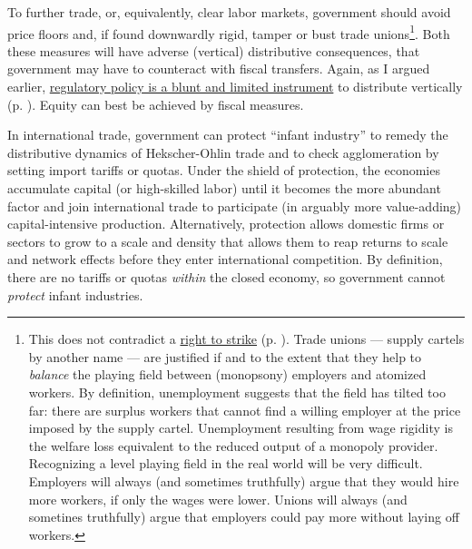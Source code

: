 To further trade, or, equivalently, clear labor markets, government should avoid price floors and, if found downwardly rigid, tamper or bust trade unions\footnote{
	This does not contradict a \hyperref[sec:redistributive_policy]{right to strike} (p. \pageref{sec:redistributive_policy}). Trade unions --- supply cartels by another name --- are justified if and to the extent that they help to \emph{balance} the playing field between (monopsony) employers and atomized workers. By definition, unemployment suggests that the field has tilted too far: there are surplus workers that cannot find a willing employer at the price imposed by the supply cartel. Unemployment resulting from wage rigidity is the welfare loss equivalent to the reduced output of a monopoly provider.\\
	Recognizing a level playing field in the real world will be very difficult. Employers will always (and sometimes truthfully) argue that they would hire more workers, if only the wages were lower. Unions will always (and sometines truthfully) argue that employers could pay more without laying off workers.}. 
Both these measures will have adverse (vertical) distributive consequences, that government may have to counteract with fiscal transfers. Again, as I argued earlier, \hyperref[sec:redistributive_policy]{regulatory policy is a blunt and limited instrument} to distribute vertically (p. \pageref{sec:redistributive_policy}). Equity can best be achieved by fiscal measures.

In international trade, government can protect ``infant industry'' to remedy the distributive dynamics of Hekscher-Ohlin trade and to check agglomeration by setting import tariffs or quotas. Under the shield of protection, the economies accumulate capital (or high-skilled labor) until it becomes the more abundant factor and join international trade to participate (in arguably more value-adding) capital-intensive production. Alternatively, protection allows domestic firms or sectors to grow to a scale and density that allows them to reap returns to scale and network effects before they enter international competition. By definition, there are no tariffs or quotas \emph{within} the closed economy, so government cannot \emph{protect} infant industries. %

